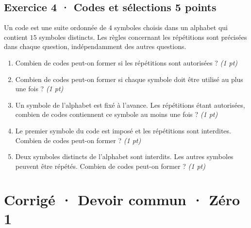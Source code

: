 \subsection*{Exercice 4 · Codes et sélections \hfill 5 points}Un code est une suite ordonnée de $4$ symboles choisis dans un alphabet qui contient $15$ symboles distincts. Les règles concernant les répétitions sont précisées dans chaque question, indépendamment des autres questions.

\begin{enumerate}

\item Combien de codes peut-on former si les répétitions sont autorisées ? \hfill\textit{(1 pt)}

\item Combien de codes peut-on former si chaque symbole doit être utilisé au plus une fois ? \hfill\textit{(1 pt)}

\item Un symbole de l'alphabet est fixé à l'avance. Les répétitions étant autorisées, combien de codes contiennent ce symbole au moins une fois ? \hfill\textit{(1 pt)}

\item Le premier symbole du code est imposé et les répétitions sont interdites. Combien de codes peut-on former ? \hfill\textit{(1 pt)}

\item Deux symboles distincts de l'alphabet sont interdits. Les autres symboles peuvent être répétés. Combien de codes peut-on former ? \hfill\textit{(1 pt)}

\end{enumerate}

\ifprof\clearpage

\section*{Corrigé · Devoir commun · Zéro 1}\label{cor:3-1}

